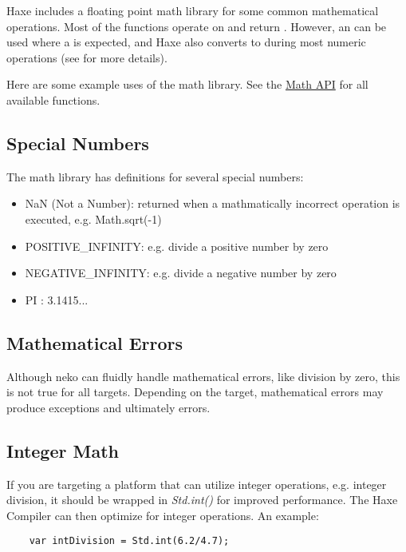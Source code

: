 Haxe includes a floating point math library for some common mathematical operations. Most of the functions operate on and return . However, an  can be used where a  is expected, and Haxe also converts  to  during most numeric operations  (see  for more details).

Here are some example uses of the math library.  See the \href{http://api.haxe.org/Math.html}{Math API} for all available functions.


\subsection{Special Numbers}
\label{std-math-special-numbers}

The math library has definitions for several special numbers:

\begin{itemize}
	\item NaN (Not a Number): returned when a mathmatically incorrect operation is executed, e.g. Math.sqrt(-1)
	\item POSITIVE_INFINITY: e.g. divide a positive number by zero
	\item NEGATIVE_INFINITY: e.g. divide a negative number by zero
	\item PI : 3.1415...
\end{itemize}

\subsection{Mathematical Errors}
\label{std-math-mathematical-errors}
Although neko can fluidly handle mathematical errors, like division by zero, this is not true for all targets.  Depending on the target, mathematical errors may produce exceptions and ultimately errors.

\subsection{Integer Math}
\label{std-math-integer-math}

If you are targeting a platform that can utilize integer operations, e.g. integer division, it should be wrapped in \emph{Std.int()} for improved performance.  The Haxe Compiler can then optimize for integer operations.  An example:

\begin{lstlisting}
	var intDivision = Std.int(6.2/4.7);
\end{lstlisting}

